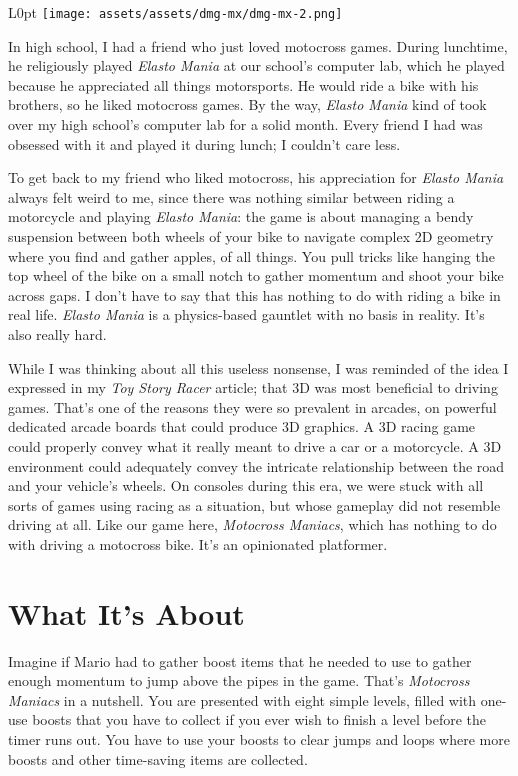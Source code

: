 \documentclass{book}
\begin{document}
\begin{wrapfigure}{L}{0pt} \texttt{[image: assets/assets/dmg-mx/dmg-mx-2.png]}\end{wrapfigure}
In high school, I had a friend who just loved motocross games. During lunchtime, he religiously played \emph{Elasto Mania} at our school’s computer lab, which he played because he appreciated all things motorsports. He would ride a bike with his brothers, so he liked motocross games. By the way, \emph{Elasto Mania} kind of took over my high school’s computer lab for a solid month. Every friend I had was obsessed with it and played it during lunch; I couldn’t care less.

To get back to my friend who liked motocross, his appreciation for \emph{Elasto Mania} always felt weird to me, since there was nothing similar between riding a motorcycle and playing \emph{Elasto Mania}: the game is about managing a bendy suspension between both wheels of your bike to navigate complex 2D geometry where you find and gather apples, of all things. You pull tricks like hanging the top wheel of the bike on a small notch to gather momentum and shoot your bike across gaps. I don’t have to say that this has nothing to do with riding a bike in real life. \emph{Elasto Mania} is a physics-based gauntlet with no basis in reality. It’s also really hard.

While I was thinking about all this useless nonsense, I was reminded of the idea I expressed in my \emph{Toy Story Racer} article; that 3D was most beneficial to driving games. That’s one of the reasons they were so prevalent in arcades, on powerful dedicated arcade boards that could produce 3D graphics. A 3D racing game could properly convey what it really meant to drive a car or a motorcycle. A 3D environment could adequately convey the intricate relationship between the road and your vehicle’s wheels. On consoles during this era, we were stuck with all sorts of games using racing as a situation, but whose gameplay did not resemble driving at all. Like our game here, \emph{Motocross Maniacs}, which has nothing to do with driving a motocross bike. It’s an opinionated platformer.

\FloatBarrier\needspace{5pt}\section*{What It’s About}\nopagebreak[4]

Imagine if Mario had to gather boost items that he needed to use to gather enough momentum to jump above the pipes in the game. That’s \emph{Motocross Maniacs} in a nutshell. You are presented with eight simple levels, filled with one-use boosts that you have to collect if you ever wish to finish a level before the timer runs out. You have to use your boosts to clear jumps and loops where more boosts and other time-saving items are collected.
\end{document}
